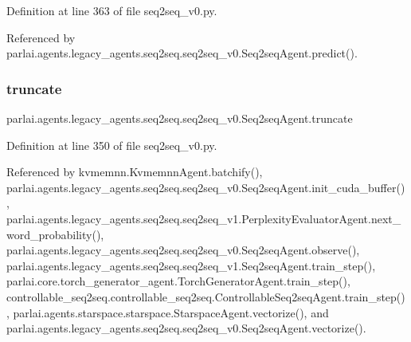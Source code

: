 Definition at line 363 of file seq2seq\+\_\+v0.\+py.



Referenced by parlai.\+agents.\+legacy\+\_\+agents.\+seq2seq.\+seq2seq\+\_\+v0.\+Seq2seq\+Agent.\+predict().

\mbox{\label{classparlai_1_1agents_1_1legacy__agents_1_1seq2seq_1_1seq2seq__v0_1_1Seq2seqAgent_a7943d21acc4e6986e15678e7da1d2f27}} 
\subsubsection{\texorpdfstring{truncate}{truncate}}
{\footnotesize\ttfamily parlai.\+agents.\+legacy\+\_\+agents.\+seq2seq.\+seq2seq\+\_\+v0.\+Seq2seq\+Agent.\+truncate}



Definition at line 350 of file seq2seq\+\_\+v0.\+py.



Referenced by kvmemnn.\+Kvmemnn\+Agent.\+batchify(), parlai.\+agents.\+legacy\+\_\+agents.\+seq2seq.\+seq2seq\+\_\+v0.\+Seq2seq\+Agent.\+init\+\_\+cuda\+\_\+buffer(), parlai.\+agents.\+legacy\+\_\+agents.\+seq2seq.\+seq2seq\+\_\+v1.\+Perplexity\+Evaluator\+Agent.\+next\+\_\+word\+\_\+probability(), parlai.\+agents.\+legacy\+\_\+agents.\+seq2seq.\+seq2seq\+\_\+v0.\+Seq2seq\+Agent.\+observe(), parlai.\+agents.\+legacy\+\_\+agents.\+seq2seq.\+seq2seq\+\_\+v1.\+Seq2seq\+Agent.\+train\+\_\+step(), parlai.\+core.\+torch\+\_\+generator\+\_\+agent.\+Torch\+Generator\+Agent.\+train\+\_\+step(), controllable\+\_\+seq2seq.\+controllable\+\_\+seq2seq.\+Controllable\+Seq2seq\+Agent.\+train\+\_\+step(), parlai.\+agents.\+starspace.\+starspace.\+Starspace\+Agent.\+vectorize(), and parlai.\+agents.\+legacy\+\_\+agents.\+seq2seq.\+seq2seq\+\_\+v0.\+Seq2seq\+Agent.\+vectorize().

\mbox{\label{classparlai_1_1agents_1_1legacy__agents_1_1seq2seq_1_1seq2seq__v0_1_1Seq2seqAgent_ab81d3b0bd5474debb2f983d1b6220d5e}} 
